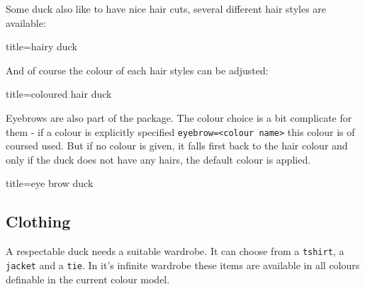 \documentclass{scrartcl}
\begin{document}
Some duck also like to have nice hair cuts, several different hair styles are available:
\begin{tcblisting}{title={hairy duck}}
\begin{tikzpicture}
	\duck[longhair]
\end{tikzpicture}
\begin{tikzpicture}
	\duck[shorthair]
\end{tikzpicture}

\begin{tikzpicture}
	\duck[crazyhair]
\end{tikzpicture}
\begin{tikzpicture}
	\duck[recedinghair]
\end{tikzpicture}
\end{tcblisting}

And of course the colour of each hair styles can be adjusted:
\begin{tcblisting}{title={coloured hair duck}}
\begin{tikzpicture}
	\duck[longhair=teal]
\end{tikzpicture}
\end{tcblisting}

Eyebrows are also part of the package. The colour choice is a bit complicate for them - if a colour is explicitly specified \verb|eyebrow=<colour name>| this colour is of coursed used. But if no colour is given, it falls first back to the hair colour and only if the duck does not have any hairs, the default colour is applied.
\begin{tcblisting}{title={eye brow duck}}
\begin{tikzpicture}
	\duck[eyebrow]
\end{tikzpicture}
\begin{tikzpicture}
	\duck[longhair=blue, 
		eyebrow]
\end{tikzpicture}

\begin{tikzpicture}
	\duck[crazyhair=red, 
		eyebrow=blue]
\end{tikzpicture}
\end{tcblisting}

\subsection{Clothing}

A respectable duck needs a suitable wardrobe. It can choose from a \verb|tshirt|, a \verb|jacket| and a \verb|tie|. In it's infinite wardrobe these items are available in all colours definable in the current colour model.
\end{document}
